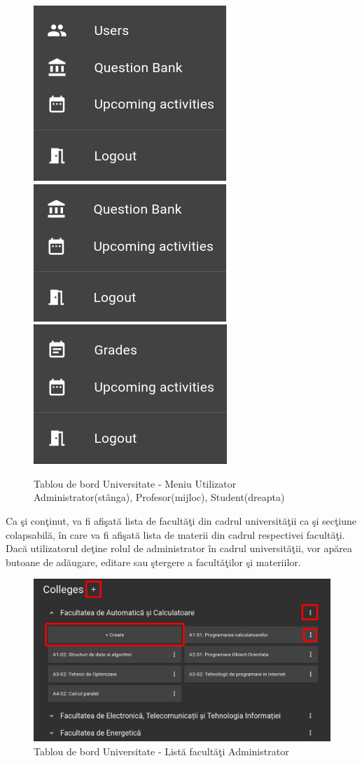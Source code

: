 \documentclass[12pt, a4paper, oneside, romanian]{teza-upb}
\begin{document}
\begin{figure}[H]
\centering
\includegraphics*[width=0.32\columnwidth]{tablou-de-bord-universitate-meniu-utilizator-administrator}
\includegraphics*[width=0.32\columnwidth]{tablou-de-bord-universitate-meniu-utilizator-profesor}
\includegraphics*[width=0.32\columnwidth]{tablou-de-bord-universitate-meniu-utilizator-student}
\caption{Tablou de bord Universitate - Meniu Utilizator Administrator(stânga), Profesor(mijloc), Student(dreapta)}
\label{tablou-de-bord-universitate-meniu-utilizator-administrator}
\end{figure}

Ca şi conţinut, va fi afişată lista de facultăţi din cadrul universităţii ca şi secţiune colapsabilă, în care va fi afişată lista de materii din cadrul respectivei facultăţi. Dacă utilizatorul deţine rolul de administrator în cadrul universităţii, vor apărea butoane de adăugare, editare sau ştergere a facultăţilor şi materiilor.

\begin{figure}[H]
\centering
\includegraphics*[width=\columnwidth]{tablou-de-bord-universitate-lista-facultati-administrator}
\caption{Tablou de bord Universitate - Listă facultăţi Administrator}
\label{tablou-de-bord-universitate-lista-facultati-administrator}
\end{figure}
\end{document}
